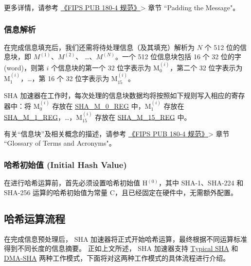 \documentclass[main\_\_CN.tex]{subfiles}
\begin{document}
更多详情，请参考 \href{https://doi.org/10.6028/NIST.FIPS.180-4}{《FIPS PUB 180-4 规范》}> 章节 ``Padding the Message"。

\subsubsection{信息解析}\label{sec:sha-parsingmessage}

在完成信息填充后，我们还需将待处理信息（及其填充）解析为 \begin{math}N\end{math} 个 512 位的信息块，即 \begin{math}M^{(1)}\end{math}、\begin{math}M^{(2)}\end{math}、 \dots、\begin{math}M^{(N)}\end{math}。一个 512 位信息块包括 16 个 32 位的字 (word)，则第 \begin{math}i\end{math} 个信息块的第一个 32 位字表示为 M$^{(i)}_{0}$，第二个 32 位字表示为 M$^{(i)}_{1}$，\dots，第 16 个 32 位字表示为 M$^{(i)}_{15}$。

SHA 加速器在工作时，每次处理的信息块数据均将按照如下规则写入相应的寄存器中：将 M$^{(i)}_{0}$ 存放在 \hyperref[regdesc:SHAMNREG]{SHA\_M\_0\_REG} 中，M$^{(i)}_1$ 存放在 \hyperref[regdesc:SHAMNREG]{SHA\_M\_1\_REG}，\dots，M$^{(i)}_{15}$ 存放在 \hyperref[regdesc:SHAMNREG]{SHA\_M\_15\_REG} 中。

\begin{tiplisting}
有关“信息块”及相关概念的描述，请参考 \href{https://doi.org/10.6028/NIST.FIPS.180-4}{《FIPS PUB 180-4 规范》}> 章节 ``Glossary of Terms and Acronyms"。
\end{tiplisting}

\subsubsection{哈希初始值 (Initial Hash Value)}\label{sec:sha-initialhash}
在进行哈希运算前，首先必须设置哈希初始值 H$^{(0)}$，其中 SHA-1、SHA-224 和 SHA-256 运算的哈希初始值为常量 C，且已经固定在硬件中，无需额外配置。

\subsection{哈希运算流程}\label{sec:sha-hash-operation}

在完成信息预处理后，\chipname{} SHA 加速器将正式开始哈希运算，最终根据不同运算标准得到不同长度的信息摘要。
正如上文所述，\chipname{} SHA 加速器支持 \hyperref[sec:sha-typical-sha]{Typical SHA} 和 \hyperref[sec:sha-dma-sha]{DMA-SHA} 两种工作模式，下面将对这两种工作模式的具体流程进行介绍。
\end{document}
